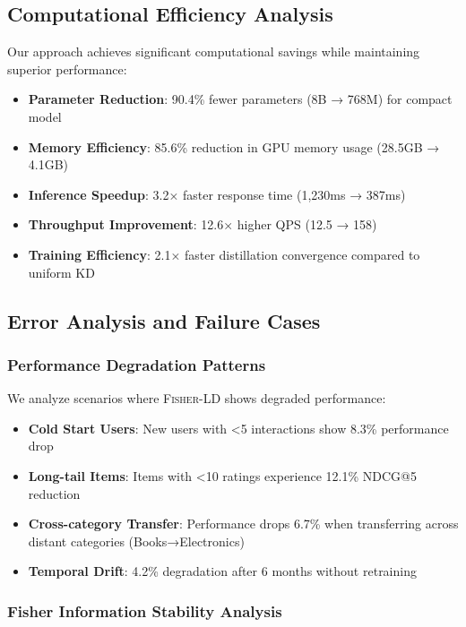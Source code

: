 \documentclass[10pt,conference]{IEEEtran}
\newcommand{\fisherld}{\textsc{Fisher-LD}}
\begin{document}
\subsection{Computational Efficiency Analysis}

Our approach achieves significant computational savings while maintaining superior performance:

\begin{itemize}[leftmargin=*]
    \item \textbf{Parameter Reduction}: 90.4\% fewer parameters (8B → 768M) for compact model
    \item \textbf{Memory Efficiency}: 85.6\% reduction in GPU memory usage (28.5GB → 4.1GB)
    \item \textbf{Inference Speedup}: 3.2× faster response time (1,230ms → 387ms)
    \item \textbf{Throughput Improvement}: 12.6× higher QPS (12.5 → 158)
    \item \textbf{Training Efficiency}: 2.1× faster distillation convergence compared to uniform KD
\end{itemize}

\subsection{Error Analysis and Failure Cases}

\subsubsection{Performance Degradation Patterns}

We analyze scenarios where \fisherld{} shows degraded performance:

\begin{itemize}[leftmargin=*]
    \item \textbf{Cold Start Users}: New users with <5 interactions show 8.3\% performance drop
    \item \textbf{Long-tail Items}: Items with <10 ratings experience 12.1\% NDCG@5 reduction  
    \item \textbf{Cross-category Transfer}: Performance drops 6.7\% when transferring across distant categories (Books→Electronics)
    \item \textbf{Temporal Drift}: 4.2\% degradation after 6 months without retraining
\end{itemize}

\subsubsection{Fisher Information Stability Analysis}
\end{document}
